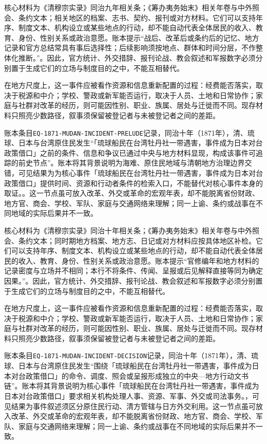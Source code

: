 核心材料为《清穆宗实录》同治九年相关条；《筹办夷务始末》相关年卷与中外照会、条约文本；相关地区的档案、志书、契约、报刊或对方材料。它们可以支持年序、制度文本、机构设立或某些地点的行动，却不能自动代表全体居民的收入、教育、身份、性别关系或政治意愿。账本提示“战后、改革后或条约后的记忆、地方记录和官方总结常具有事后选择性；后续影响须按地点、群体和时间分层，不作整体化推断。”。因此，官方统计、外交措辞、报刊论战、教会叙述和军报数字必须分别置于生成它们的立场与制度目的之中，不能互相替代。

在地方尺度上，这一事件应被看作资源和信息重新配置的过程：经费能否落实，取决于税源和中介；学校、警政或新军能否运行，取决于人员、土地和日常协作；家庭与社群对改革的经历，则可能因性别、职业、族属、居处与迁徙而不同。现存材料只照亮少数路径，叙事须保留被登记者与未被登记者之间的差距。

账本条目\texttt{EQ-1871-MUDAN-INCIDENT-PRELUDE}记录，同治十年（1871年），清、琉球、日本与台湾原住民发生“「琉球船民在台湾牡丹社一带遇害，事件成为日本对台政策借口」之前的条件、信息和争议已通过中央与地方材料显现，构成该事件可追踪的前史节点”。账本将其背景说明为海难、原住民地域与清朝地方治理边界交错，可见结果为为核心事件「琉球船民在台湾牡丹社一带遇害，事件成为日本对台政策借口」提供时间、资源和行动者条件的检索入口，不能替代对核心事件本身的取证。。这一节点虽可放入改革、外交或革命的宏观年表，却不能脱离省份财政、地方官、商会、学校、军队、家庭与交通网络来理解；同一上谕、条约或战事在不同地域的实际后果并不一致。

核心材料为《清穆宗实录》同治十年相关条；《筹办夷务始末》相关年卷与中外照会、条约文本；同时期地方档案、地方志、日记或对方材料应按具体地区补检。它们可以支持年序、制度文本、机构设立或某些地点的行动，却不能自动代表全体居民的收入、教育、身份、性别关系或政治意愿。账本提示“官修编年和地方材料的记录密度与立场并不相同；本行不将条件、传闻、呈报或后见解释直接等同为确定因果。”。因此，官方统计、外交措辞、报刊论战、教会叙述和军报数字必须分别置于生成它们的立场与制度目的之中，不能互相替代。

在地方尺度上，这一事件应被看作资源和信息重新配置的过程：经费能否落实，取决于税源和中介；学校、警政或新军能否运行，取决于人员、土地和日常协作；家庭与社群对改革的经历，则可能因性别、职业、族属、居处与迁徙而不同。现存材料只照亮少数路径，叙事须保留被登记者与未被登记者之间的差距。

账本条目\texttt{EQ-1871-MUDAN-INCIDENT-DECISION}记录，同治十年（1871年），清、琉球、日本与台湾原住民发生“围绕「琉球船民在台湾牡丹社一带遇害，事件成为日本对台政策借口」的命令、调度、照会或呈报形成独立的中央—地方行动文书链”。账本将其背景说明为核心事件「琉球船民在台湾牡丹社一带遇害，事件成为日本对台政策借口」要求相关机构处理人事、资源、军事、外交或司法事务。，可见结果为事件叙述须区分原住民行动、清方管辖与日方外交利用。这一节点虽可放入改革、外交或革命的宏观年表，却不能脱离省份财政、地方官、商会、学校、军队、家庭与交通网络来理解；同一上谕、条约或战事在不同地域的实际后果并不一致。

